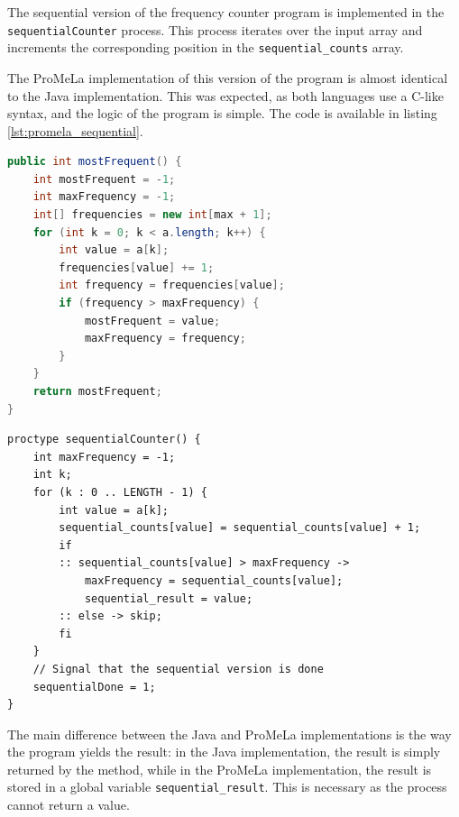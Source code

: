 \documentclass[a4paper, 11pt]{article}
\begin{document}
The sequential version of the frequency counter program is implemented in the \texttt{sequentialCounter} process. This process iterates over the input array and increments the corresponding position in the \texttt{sequential\_counts} array.

The ProMeLa implementation of this version of the program is almost identical to the Java implementation. This was expected, as both languages use a C-like syntax, and the logic of the program is simple. The code is available in listing \ref{lst:promela_sequential}.

\begin{minipage}[t]{0.45\textwidth}
	\begin{lstlisting}[language=Java, caption={Java sequential version of the frequency counter program}, captionpos=b, label={lst:java_frequency}]
public int mostFrequent() {
    int mostFrequent = -1;
    int maxFrequency = -1;
    int[] frequencies = new int[max + 1];
    for (int k = 0; k < a.length; k++) {
        int value = a[k];
        frequencies[value] += 1;
        int frequency = frequencies[value];
        if (frequency > maxFrequency) {
            mostFrequent = value;
            maxFrequency = frequency;
        }
    }
    return mostFrequent;
}

  \end{lstlisting}
\end{minipage}\hfill
\begin{minipage}[t]{0.45\textwidth}
	\begin{lstlisting}[language=Promela, caption={ProMeLa sequential version of the frequency counter program}, captionpos=b, breaklines=true, label={lst:promela_sequential}]
proctype sequentialCounter() {
    int maxFrequency = -1;
    int k;
    for (k : 0 .. LENGTH - 1) {
        int value = a[k];
        sequential_counts[value] = sequential_counts[value] + 1;
        if
        :: sequential_counts[value] > maxFrequency -> 
            maxFrequency = sequential_counts[value];
            sequential_result = value;
        :: else -> skip;
        fi
    }
    // Signal that the sequential version is done
    sequentialDone = 1;
}
  \end{lstlisting}
\end{minipage}

\noindent The main difference between the Java and ProMeLa implementations is the way the program yields the result: in the Java implementation, the result is simply returned by the method, while in the ProMeLa implementation, the result is stored in a global variable \texttt{sequential\_result}. This is necessary as the process cannot return a value.
\end{document}
